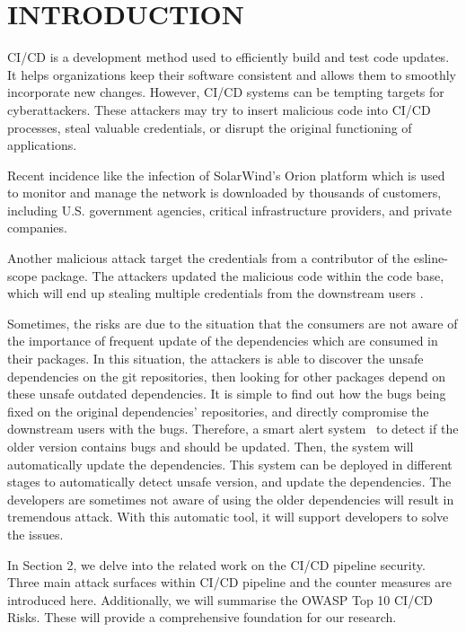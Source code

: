 \section{INTRODUCTION}
CI/CD is a development method used to efficiently build and test code updates. 
It helps organizations keep their software consistent and allows them to smoothly 
incorporate new changes. However, CI/CD systems can be tempting targets for cyberattackers. 
These attackers may try to insert malicious code into CI/CD processes, 
steal valuable credentials, or disrupt the original functioning of applications.

Recent incidence like the infection of SolarWind's Orion platform \cite{ladisa2023sok, 
peisert2021perspectives} which is used to monitor and manage the network is downloaded by 
thousands of customers, including U.S. government agencies, critical infrastructure providers, 
and private companies. 

Another malicious attack target the credentials from a contributor of the esline-scope package.
The attackers updated the malicious code within the code base, which will end up stealing
multiple credentials from the downstream users \cite{eslint2018}.

Sometimes, the risks are due to the situation that the consumers are not aware of the importance 
of frequent update of the dependencies which are consumed in their packages. In this situation,
the attackers is able to discover the unsafe dependencies on the git repositories, then looking for
other packages depend on these unsafe outdated dependencies. It is simple to find out how the bugs being
fixed on the original dependencies' repositories, and directly compromise the downstream users with the bugs.
Therefore, a smart alert system~\cite{wang2020empirical} to detect if the older version contains
bugs and should be updated. Then, the system will automatically update the dependencies. This system can be deployed
in different stages to automatically detect unsafe version, and update the dependencies. The developers 
are sometimes not aware of using the older dependencies will result in tremendous attack. With this automatic tool,
it will support developers to solve the issues.

In Section 2, we delve into the related work on the CI/CD pipeline security. Three main 
attack surfaces within CI/CD pipeline and the counter measures are introduced here. 
Additionally, we will summarise the OWASP Top 10 CI/CD Risks. These will provide a comprehensive
foundation for our research. 

